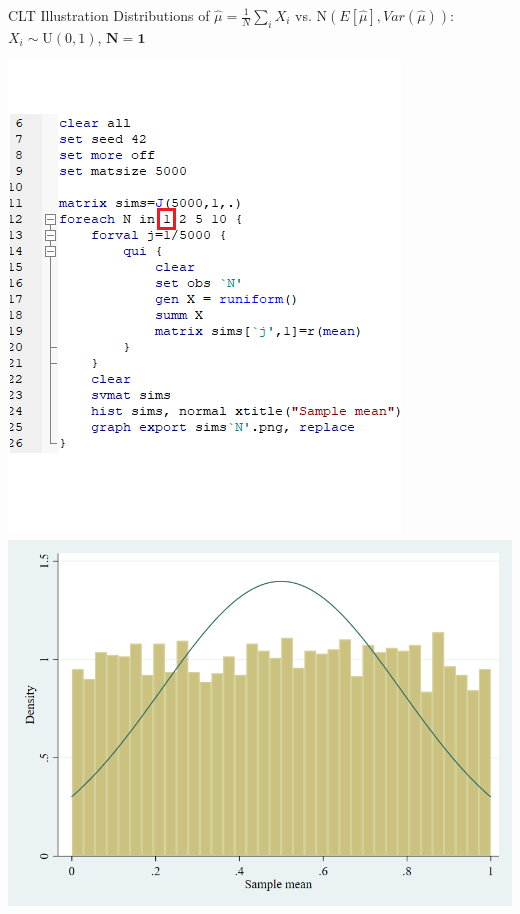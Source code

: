 \documentclass[11pt,english,handout]{beamer}
\begin{document}
\begin{frame}{CLT Illustration}
	\vspace{0.2cm}
	Distributions of $\hat{\mu}=\frac{1}{N}\sum_i X_i$ vs. $\mathrm{N}(E[\hat\mu],Var(\hat{\mu}))$: $X_i\sim \mathrm{U}(0,1)$, $\mathbf{N=1}$
	
	\begin{center}
		\includegraphics[scale=0.4]{Stata1.png} \includegraphics[scale=0.25]{sims1.png}
	\end{center}
	
\end{frame}
\end{document}
